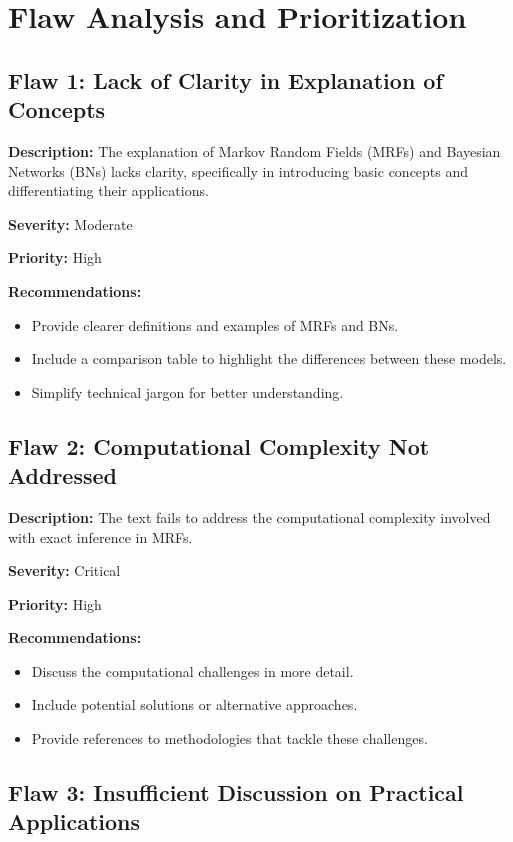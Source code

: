 \documentclass{article}
\begin{document}
\section*{Flaw Analysis and Prioritization}

\subsection*{Flaw 1: Lack of Clarity in Explanation of Concepts}

\textbf{Description:} The explanation of Markov Random Fields (MRFs) and Bayesian Networks (BNs) lacks clarity, specifically in introducing basic concepts and differentiating their applications.

\textbf{Severity:} Moderate

\textbf{Priority:} High

\textbf{Recommendations:} 
\begin{itemize}
    \item Provide clearer definitions and examples of MRFs and BNs.
    \item Include a comparison table to highlight the differences between these models.
    \item Simplify technical jargon for better understanding.
\end{itemize}

\subsection*{Flaw 2: Computational Complexity Not Addressed}

\textbf{Description:} The text fails to address the computational complexity involved with exact inference in MRFs.

\textbf{Severity:} Critical

\textbf{Priority:} High

\textbf{Recommendations:}
\begin{itemize}
    \item Discuss the computational challenges in more detail.
    \item Include potential solutions or alternative approaches.
    \item Provide references to methodologies that tackle these challenges.
\end{itemize}

\subsection*{Flaw 3: Insufficient Discussion on Practical Applications}
\end{document}
